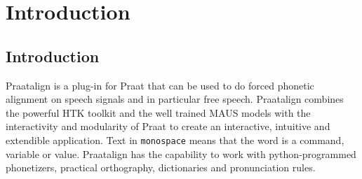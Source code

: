 
\cleardoublepage
\maketitle
\setcounter{page}{1}
\tableofcontents
\chapter{Introduction}
\section{Introduction}
Praatalign is a plug-in for Praat that can be used to do forced phonetic
alignment on speech signals and in particular free speech. Praatalign combines
the powerful HTK toolkit and the well trained MAUS models with the
interactivity and modularity of Praat to create an interactive, intuitive and
extendible application. Text in \texttt{monospace} means that the word is a
command, variable or value. Praatalign has the capability to work with
python-programmed phonetizers, practical orthography, dictionaries and
pronunciation rules.

